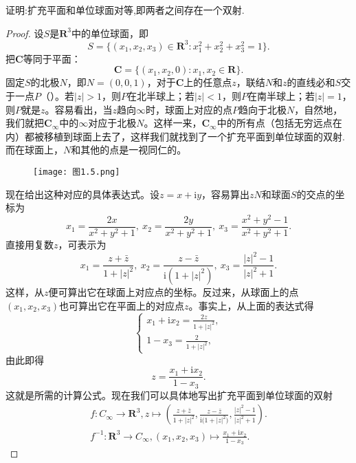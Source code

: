 \documentclass[../../main.tex]{subfiles}
\begin{document}
\begin{proposition}
证明:扩充平面和单位球面对等,即两者之间存在一个双射.
\end{proposition}
\begin{proof}
设\(S\)是\(\mathbf{R}^3\)中的单位球面，即
\[
S = \{ (x_1, x_2, x_3) \in \mathbf{R}^3 : x_1^2 + x_2^2 + x_3^2 = 1 \}.
\]
把\(\mathbf{C}\)等同于平面：
\[
\mathbf{C} = \{ (x_1, x_2, 0) : x_1, x_2 \in \mathbf{R} \}.
\]
固定\(S\)的北极\(N\)，即\(N = (0, 0, 1)\)，对于\(\mathbf{C}\)上的任意点\(z\)，联结\(N\)和\(z\)的直线必和\(S\)交于一点\(P\)（）。若\(|z| > 1\)，则\(P\)在北半球上；若\(|z| < 1\)，则\(P\)在南半球上；若\(|z| = 1\)，则\(P\)就是\(z\)。容易看出，当\(z\)趋向\(\infty\)时，球面上对应的点\(P\)趋向于北极\(N\)，自然地，我们就把\(\mathbf{C}_\infty\)中的\(\infty\)对应于北极\(N\)。这样一来，\(\mathbf{C}_\infty\)中的所有点（包括无穷远点在内）都被移植到球面上去了，这样我们就找到了一个扩充平面到单位球面的双射.而在球面上，\(N\)和其他的点是一视同仁的。
\begin{figure}[H]
\centering
\texttt{[image: 图1.5.png]}
\caption{}
\label{figure:图1.5}
\end{figure}
现在给出这种对应的具体表达式。设\(z = x + \mathrm{i}y\)，容易算出\(zN\)和球面\(S\)的交点的坐标为
\[
x_1 = \frac{2x}{x^2 + y^2 + 1}, \ x_2 = \frac{2y}{x^2 + y^2 + 1}, \ x_3 = \frac{x^2 + y^2 - 1}{x^2 + y^2 + 1}.
\]
直接用复数\(z\)，可表示为
\[
x_1 = \frac{z + \bar{z}}{1 + |z|^2}, \ x_2 = \frac{z - \bar{z}}{\mathrm{i}(1 + |z|^2)}, \ x_3 = \frac{|z|^2 - 1}{|z|^2 + 1}.
\]
这样，从\(z\)便可算出它在球面上对应点的坐标。反过来，从球面上的点\((x_1, x_2, x_3)\)也可算出它在平面上的对应点\(z\)。事实上，从上面的表达式得
\[
\begin{cases}
x_1 + \mathrm{i}x_2 = \frac{2z}{1 + |z|^2}, \\
1 - x_3 = \frac{2}{1 + |z|^2},
\end{cases}
\]
由此即得
\[
z = \frac{x_1 + \mathrm{i}x_2}{1 - x_3}.
\]
这就是所需的计算公式。现在我们可以具体地写出扩充平面到单位球面的双射
\begin{gather*}
f:C_{\infty}\longrightarrow \mathbf{R} ^3,
z\longmapsto \left( \frac{z+\bar{z}}{1+|z|^2}, \frac{z-\bar{z}}{\mathrm{i(}1+|z|^2)}, \frac{|z|^2-1}{|z|^2+1} \right) .
\\
f^{-1}:\mathbf{R} ^3\longrightarrow C_{\infty},
\left( x_1,x_2,x_3 \right) \longmapsto \frac{x_1+\mathrm{i}x_2}{1-x_3}.
\end{gather*}

\end{proof}
\end{document}

